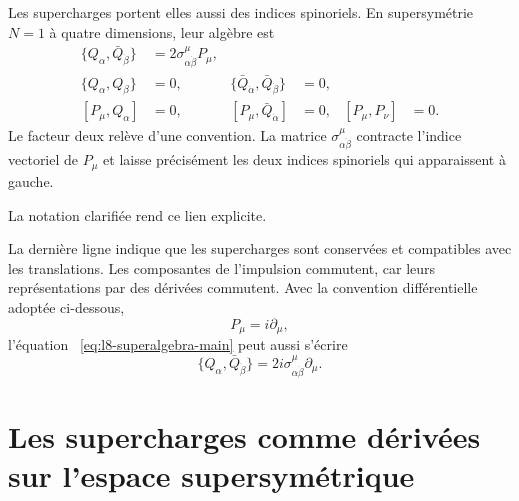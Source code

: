 Les supercharges portent elles aussi des indices spinoriels. En supersymétrie \(N=1\) à quatre dimensions, leur algèbre est
\begin{align}
\{Q_\alpha,\bar Q_{\dot\beta}\}
&=2\sigma^\mu_{\alpha\dot\beta}P_\mu,
\label{eq:l8-superalgebra-main}\\
\{Q_\alpha,Q_\beta\}&=0,
&
\{\bar Q_{\dot\alpha},\bar Q_{\dot\beta}\}&=0,
\label{eq:l8-superalgebra-nilpotent}\\
[P_\mu,Q_\alpha]&=0,
&
[P_\mu,\bar Q_{\dot\alpha}]&=0,
&
[P_\mu,P_\nu]&=0.
\label{eq:l8-superalgebra-commutators}
\end{align}
Le facteur deux relève d’une convention. La matrice
\(\sigma^\mu_{\alpha\dot\beta}\) contracte l’indice vectoriel de \(P_\mu\) et laisse précisément les deux indices spinoriels qui apparaissent à gauche.

\begin{classroomqa}
\end{classroomqa}

La notation clarifiée rend ce lien explicite.

La dernière ligne indique que les supercharges sont conservées et compatibles avec les translations. Les composantes de l’impulsion commutent, car leurs représentations par des dérivées commutent. Avec la convention différentielle adoptée ci-dessous,
\begin{equation}
P_\mu=i\partial_\mu,
\end{equation}
l’équation ~\eqref{eq:l8-superalgebra-main} peut aussi s’écrire
\begin{equation}
\{Q_\alpha,\bar Q_{\dot\beta}\}
=2i\sigma^\mu_{\alpha\dot\beta}\partial_\mu.
\end{equation}

\section{Les supercharges comme dérivées sur l’espace supersymétrique}

